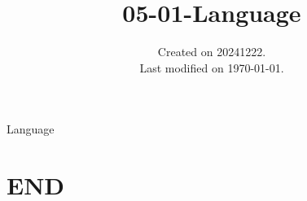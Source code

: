 \documentclass[UTF8]{../../RepresentationUniverse}
\begin{document}
\title{05-01-Language}
\date{Created on 20241222.\\   Last modified on \today.}
\maketitle
\tableofcontents

 


Language


\chapter{END}
\end{document}
